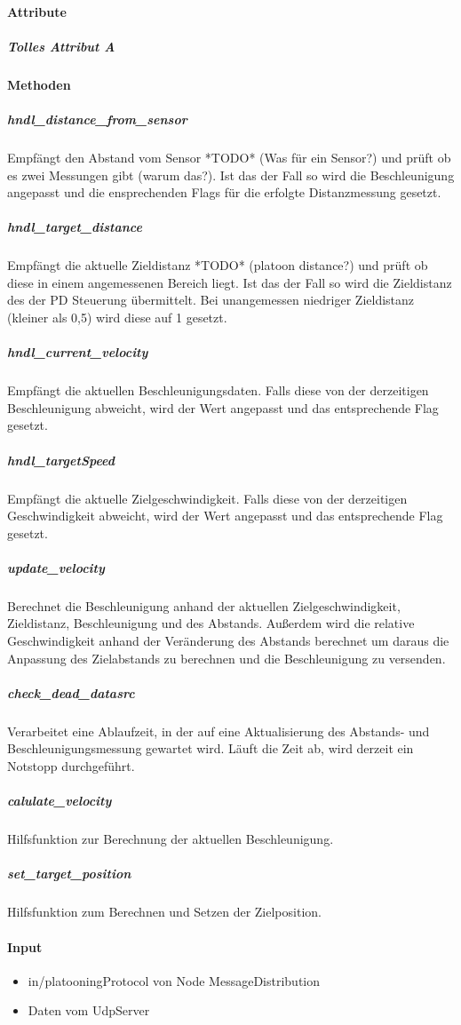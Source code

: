 \documentclass[a4paper, 12pt, titlepage]{scrartcl}
\begin{document}
				\paragraph{Attribute}
					\subparagraph{Tolles Attribut A}
				\paragraph{Methoden}
					\subparagraph{hndl\_distance\_from\_sensor} Empfängt den Abstand vom Sensor *TODO* (Was für ein Sensor?) und prüft ob es zwei Messungen gibt (warum das?). Ist das der Fall so wird die Beschleunigung angepasst und die ensprechenden Flags für die erfolgte Distanzmessung gesetzt.

					\subparagraph{hndl\_target\_distance} Empfängt die aktuelle Zieldistanz *TODO* (platoon distance?) und prüft ob diese in einem angemessenen Bereich liegt. Ist das der Fall so wird die Zieldistanz des der PD Steuerung übermittelt. Bei unangemessen niedriger Zieldistanz (kleiner als 0,5) wird diese auf 1 gesetzt.

					\subparagraph{hndl\_current\_velocity} Empfängt die aktuellen Beschleunigungsdaten. Falls diese von der derzeitigen Beschleunigung abweicht, wird der Wert angepasst und das entsprechende Flag gesetzt.

					\subparagraph{hndl\_targetSpeed} Empfängt die aktuelle Zielgeschwindigkeit. Falls diese von der derzeitigen Geschwindigkeit abweicht, wird der Wert angepasst und das entsprechende Flag gesetzt.

					\subparagraph{update\_velocity} Berechnet die Beschleunigung anhand der aktuellen Zielgeschwindigkeit, Zieldistanz, Beschleunigung und des Abstands. Außerdem wird die relative Geschwindigkeit anhand der Veränderung des Abstands berechnet um daraus die Anpassung des Zielabstands zu berechnen und die Beschleunigung zu versenden.

					\subparagraph{check\_dead\_datasrc} Verarbeitet eine Ablaufzeit, in der auf eine Aktualisierung des Abstands- und Beschleunigungsmessung gewartet wird. Läuft die Zeit ab, wird derzeit ein Notstopp durchgeführt.

					\subparagraph{calulate\_velocity} Hilfsfunktion zur Berechnung der aktuellen Beschleunigung.

					\subparagraph{set\_target\_position} Hilfsfunktion zum Berechnen und Setzen der Zielposition.


				\paragraph{Input}
				    \begin{itemize}
				    	\item in/platooningProtocol von Node MessageDistribution
				    	\item Daten vom UdpServer
				    \end{itemize}
\end{document}
